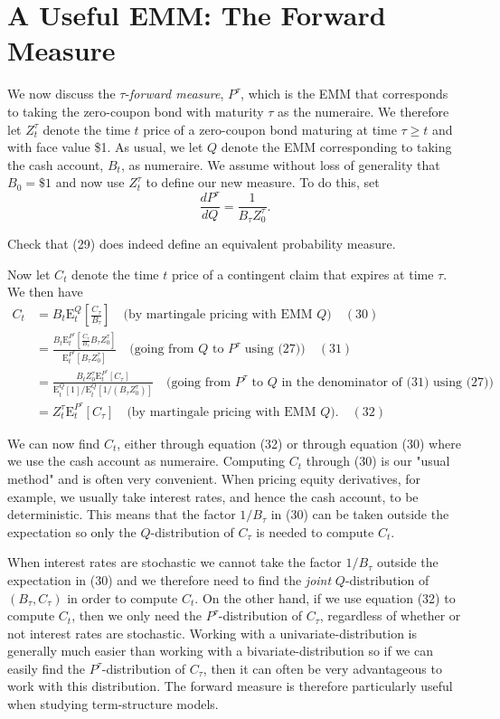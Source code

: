 \section{A Useful EMM: The Forward Measure}
We now discuss the $\tau$-\textit{forward measure}, $P^\tau$, which is the EMM that corresponds to taking the zero-coupon bond with maturity $\tau$ as the numeraire. We therefore let $Z_t^\tau$ denote the time $t$ price of a zero-coupon bond maturing at time $\tau\geq t$ and with face value \$1. As usual, we let $Q$ denote the EMM corresponding to taking the cash account, $B_t$, as numeraire. We assume without loss of generality that $B_0=\$1$ and now use $Z_t^\tau$ to define our new measure. To do this, set
\[\frac{dP^\tau}{dQ} = \frac{1}{B_\tau Z_0^\tau}. \tag{29}\]

\begin{example}
Check that (29) does indeed define an equivalent probability measure.
\end{example}

Now let $C_t$ denote the time $t$ price of a contingent claim that expires at time $\tau$. We then have
\begin{align*}
C_t &= B_t \mathrm{E}_t^Q\left[\frac{C_\tau}{B_\tau}\right] \quad \text{(by martingale pricing with EMM $Q$)} \quad(30) \\
&= \frac{B_t \mathrm{E}_t^{P^\tau}\left[\frac{C_\tau}{B_\tau} B_\tau Z_0^\tau\right]}{\mathrm{E}_t^{P^\tau}\left[B_\tau Z_0^\tau\right]} \quad \text{(going from $Q$ to $P^\tau$ using (27))} \quad(31) \\
&= \frac{B_t Z_0^\tau \mathrm{E}_t^{P^\tau}\left[C_\tau\right]}{\mathrm{E}_t^Q[1] / \mathrm{E}_t^Q[1/(B_\tau Z_0^\tau)]} \quad \text{(going from $P^\tau$ to $Q$ in the denominator of (31) using (27))} \\
&= Z_t^\tau \mathrm{E}_t^{P^\tau}\left[C_\tau\right] \quad \text{(by martingale pricing with EMM $Q$).} \quad(32)
\end{align*}

We can now find $C_t$, either through equation (32) or through equation (30) where we use the cash account as numeraire. Computing $C_t$ through (30) is our "usual method" and is often very convenient. When pricing equity derivatives, for example, we usually take interest rates, and hence the cash account, to be deterministic. This means that the factor $1/B_\tau$ in (30) can be taken outside the expectation so only the $Q$-distribution of $C_\tau$ is needed to compute $C_t$.

When interest rates are stochastic we cannot take the factor $1/B_\tau$ outside the expectation in (30) and we therefore need to find the \textit{joint} $Q$-distribution of $(B_\tau,C_\tau)$ in order to compute $C_t$. On the other hand, if we use equation (32) to compute $C_t$, then we only need the $P^\tau$-distribution of $C_\tau$, regardless of whether or not interest rates are stochastic. Working with a univariate-distribution is generally much easier than working with a bivariate-distribution so if we can easily find the $P^\tau$-distribution of $C_\tau$, then it can often be very advantageous to work with this distribution. The forward measure is therefore particularly useful when studying term-structure models.

